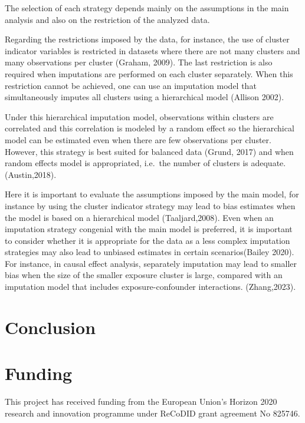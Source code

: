 \documentclass[
]{jss}
\begin{document}
The selection of each strategy depends mainly on the assumptions in the
main analysis and also on the restriction of the analyzed data.

Regarding the restrictions imposed by the data, for instance, the use of
cluster indicator variables is restricted in datasets where there are
not many clusters and many observations per cluster (Graham, 2009). The
last restriction is also required when imputations are performed on each
cluster separately. When this restriction cannot be achieved, one can
use an imputation model that simultaneously imputes all clusters using a
hierarchical model (Allison 2002).

Under this hierarchical imputation model, observations within clusters
are correlated and this correlation is modeled by a random effect so the
hierarchical model can be estimated even when there are few observations
per cluster. However, this strategy is best suited for balanced data
(Grund, 2017) and when random effects model is appropriated, i.e.~the
number of clusters is adequate. (Austin,2018).

Here it is important to evaluate the assumptions imposed by the main
model, for instance by using the cluster indicator strategy may lead to
bias estimates when the model is based on a hierarchical model
(Taaljard,2008). Even when an imputation strategy congenial with the
main model is preferred, it is important to consider whether it is
appropriate for the data as a less complex imputation strategies may
also lead to unbiased estimates in certain scenarios(Bailey 2020). For
instance, in causal effect analysis, separately imputation may lead to
smaller bias when the size of the smaller exposure cluster is large,
compared with an imputation model that includes exposure-confounder
interactions. (Zhang,2023).

\hypertarget{conclusion}{%
\section{Conclusion}\label{conclusion}}

\hypertarget{funding}{%
\section{Funding}\label{funding}}

This project has received funding from the European Union's Horizon 2020
research and innovation programme under ReCoDID grant agreement No
825746.
\end{document}
